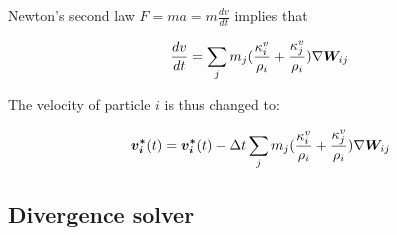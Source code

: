     Newton's second law $F = ma = m\frac{dv}{dt}$ implies that 

    \begin{equation} \label{dvdt}
        \frac{dv}{dt} = \sum_j m_j (\frac{\kappa_i^v}{\rho_i} + \frac{\kappa_j^v}{\rho_i}) \nabla \bm{W}_{ij}
    \end{equation}

    The velocity of particle $i$ is thus changed to:

    \begin{equation} \label{eq:velocity}
        \bm{v_i^*}(t) = \bm{v_i^*}(t) - \Delta t \sum_j m_j (\frac{\kappa_i^v}{\rho_i} + \frac{\kappa_j^v}{\rho_i}) \nabla \bm{W}_{ij}
    \end{equation}



\subsection{Divergence solver} \label{divergenceSolver}

